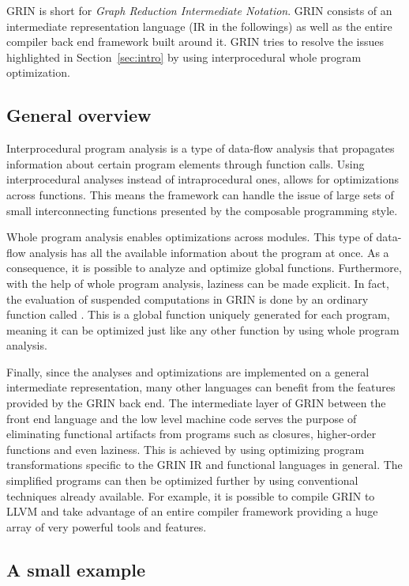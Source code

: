 \documentclass[main.tex]{subfiles}
\begin{document}
	
	GRIN is short for \emph{Graph Reduction Intermediate Notation}. GRIN consists of an intermediate representation language (IR in the followings) as well as the entire compiler back end framework built around it. GRIN tries to resolve the issues highlighted in Section~\ref{sec:intro} by using interprocedural whole program optimization. 
	
	\subsection{General overview}
	
	Interprocedural program analysis is a type of data-flow analysis that propagates information about certain program elements through function calls. Using interprocedural analyses instead of intraprocedural ones, allows for optimizations across functions. This means the framework can handle the issue of large sets of small interconnecting functions presented by the composable programming style. 
	
	Whole program analysis enables optimizations across modules. This type of data-flow analysis has all the available information about the program at once. As a consequence, it is possible to analyze and optimize global functions. Furthermore, with the help of whole program analysis, laziness can be made explicit. In fact, the evaluation of suspended computations in GRIN is done by an ordinary function called . This is a global function uniquely generated for each program, meaning it can be optimized just like any other function by using whole program analysis. 
	
	Finally, since the analyses and optimizations are implemented on a general intermediate representation, many other languages can benefit from the features provided by the GRIN back end. The intermediate layer of GRIN between the front end language and the low level machine code serves the purpose of eliminating functional artifacts from programs such as closures, higher-order functions and even laziness. This is achieved by using optimizing program transformations specific to the GRIN IR and functional languages in general. The simplified programs can then be optimized further by using conventional techniques already available. For example, it is possible to compile GRIN to LLVM and take advantage of an entire compiler framework providing a huge array of very powerful tools and features.
	
	
	\subsection{A small example}
	
\end{document}
